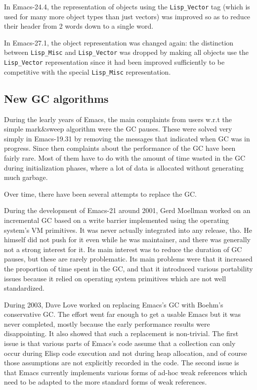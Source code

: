 \documentclass[format=acmsmall, review=false, screen=true]{acmart}
\newcommand \Elisp {Elisp}
\begin{document}
In Emacs-24.4, the representation of objects using the \texttt{Lisp\_Vector}
tag (which is used for many more object types than just vectors) was
improved so as to reduce their header from 2 words down to a single word.

In Emacs-27.1, the object representation was changed again: the distinction
between \texttt{Lisp\_Misc} and \texttt{Lisp\_Vector} was dropped by making
all objects use the \texttt{Lisp\_Vector} representation since it had been
improved sufficiently to be competitive with the special
\texttt{Lisp\_Misc} representation.


\subsection{New GC algorithms}
During the learly years of Emacs, the main complaints from users w.r.t the
simple mark\&sweep algorithm were the GC pauses.  These were solved very
simply in Emacs-19.31 by removing the messages that indicated when GC was in
progress.  Since then complaints about the performance of the GC have been
fairly rare.  Most of them have to do with the amount of time wasted in the
GC during initialization phases, where a lot of data is allocated without
generating much garbage.

Over time, there have been several attempts to replace the GC.

During the development of Emacs-21 around 2001, Gerd Moellman worked on an incremental
GC based on a write barrier implemented using the operating system's VM
primitives.  It was never actually integrated into any release, tho.
He himself did not push for it even while he was maintainer, and there was
generally not a strong interest for it.  Its main interest was to reduce the
duration of GC pauses, but these are rarely problematic.  Its main problems
were that it increased the proportion of time spent in the GC, and that it
introduced various portability issues because it relied on operating system
primitives which are not well standardized.

During 2003, Dave Love worked on replacing Emacs's GC with Boehm's
conservative GC.  The effort went far enough to get a usable Emacs but it
was never completed, mostly because the early performance results were
disappointing.  It also showed that such a replacement is non-trivial.
The first issue is that various parts of Emacs's code assume that
a collection can only occur during \Elisp{} code execution and not during
heap allocation, and of course those assumptions are not explicitly recorded
in the code.  The second issue is that Emacs currently implements various
forms of ad-hoc weak references which need to be adapted to the more
standard forms of weak references.
\end{document}
